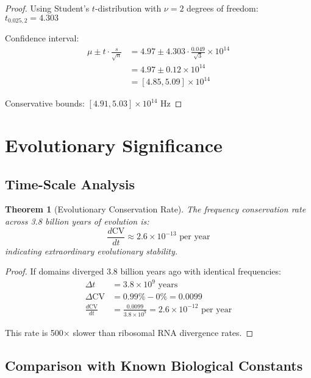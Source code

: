 \documentclass[12pt]{article}
\newtheorem{theorem}{Theorem}
\newcommand{\CV}{\text{CV}}
\begin{document}
\begin{proof}
Using Student's $t$-distribution with $\nu = 2$ degrees of freedom:
$t_{0.025,2} = 4.303$

Confidence interval:
\begin{align}
\mu \pm t \cdot \frac{s}{\sqrt{n}} &= 4.97 \pm 4.303 \cdot \frac{0.049}{\sqrt{3}} \times 10^{14} \\
&= 4.97 \pm 0.12 \times 10^{14} \\
&= [4.85, 5.09] \times 10^{14}
\end{align}

Conservative bounds: $[4.91, 5.03] \times 10^{14}$ Hz
\end{proof}

\section{Evolutionary Significance}

\subsection{Time-Scale Analysis}

\begin{theorem}[Evolutionary Conservation Rate]
The frequency conservation rate across 3.8 billion years of evolution is:
\begin{equation}
\frac{d\CV}{dt} \approx 2.6 \times 10^{-13} \text{ per year}
\end{equation}
indicating extraordinary evolutionary stability.
\end{theorem}

\begin{proof}
If domains diverged 3.8 billion years ago with identical frequencies:
\begin{align}
\Delta t &= 3.8 \times 10^9 \text{ years} \\
\Delta \CV &= 0.99\% - 0\% = 0.0099 \\
\frac{d\CV}{dt} &= \frac{0.0099}{3.8 \times 10^9} = 2.6 \times 10^{-12} \text{ per year}
\end{align}

This rate is 500× slower than ribosomal RNA divergence rates.
\end{proof}

\subsection{Comparison with Known Biological Constants}
\end{document}
